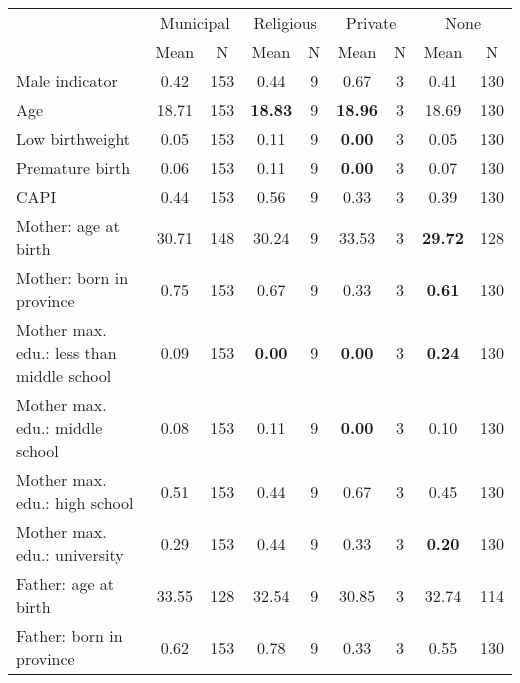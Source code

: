 \begin{tabular}{l c c c c c c c c}
\toprule
& \multicolumn{2}{c}{Municipal} & \multicolumn{2}{c}{Religious} & \multicolumn{2}{c}{Private} & \multicolumn{2}{c}{None} \\
& \scriptsize Mean & \scriptsize N & \scriptsize Mean & \scriptsize N & \scriptsize Mean & \scriptsize N & \scriptsize Mean & \scriptsize N \\
\midrule
Male indicator &      0.42 &       153 &      0.44 &         9 &      0.67 &         3 &      0.41 &       130 \\
Age &     18.71 &       153 & \textbf{    18.83} &         9 & \textbf{    18.96} &         3 &     18.69 &       130 \\
Low birthweight &      0.05 &       153 &      0.11 &         9 & \textbf{     0.00} &         3 &      0.05 &       130 \\
Premature birth &      0.06 &       153 &      0.11 &         9 & \textbf{     0.00} &         3 &      0.07 &       130 \\
CAPI &      0.44 &       153 &      0.56 &         9 &      0.33 &         3 &      0.39 &       130 \\
Mother: age at birth &     30.71 &       148 &     30.24 &         9 &     33.53 &         3 & \textbf{    29.72} &       128 \\
Mother: born in province &      0.75 &       153 &      0.67 &         9 &      0.33 &         3 & \textbf{     0.61} &       130 \\
Mother max. edu.: less than middle school &      0.09 &       153 & \textbf{     0.00} &         9 & \textbf{     0.00} &         3 & \textbf{     0.24} &       130 \\
Mother max. edu.: middle school &      0.08 &       153 &      0.11 &         9 & \textbf{     0.00} &         3 &      0.10 &       130 \\
Mother max. edu.: high school &      0.51 &       153 &      0.44 &         9 &      0.67 &         3 &      0.45 &       130 \\
Mother max. edu.: university &      0.29 &       153 &      0.44 &         9 &      0.33 &         3 & \textbf{     0.20} &       130 \\
Father: age at birth &     33.55 &       128 &     32.54 &         9 &     30.85 &         3 &     32.74 &       114 \\
Father: born in province &      0.62 &       153 &      0.78 &         9 &      0.33 &         3 &      0.55 &       130 \\

\end{tabular}
